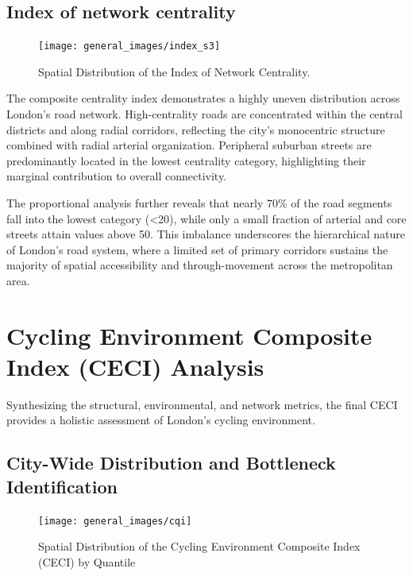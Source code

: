 \documentclass[
  12pt,
  oneside]{book}
\begin{document}
\subsection{Index of network centrality}\label{index-of-network-centrality}

\begin{figure}

{\centering \texttt{[image: general\_images/index\_s3]} 

}

\caption{Spatial Distribution of the Index of Network Centrality.}\label{fig:indexs3}
\end{figure}

The composite centrality index demonstrates a highly uneven distribution across London's road network. High-centrality roads are concentrated within the central districts and along radial corridors, reflecting the city's monocentric structure combined with radial arterial organization. Peripheral suburban streets are predominantly located in the lowest centrality category, highlighting their marginal contribution to overall connectivity.

The proportional analysis further reveals that nearly 70\% of the road segments fall into the lowest category (\textless20), while only a small fraction of arterial and core streets attain values above 50. This imbalance underscores the hierarchical nature of London's road system, where a limited set of primary corridors sustains the majority of spatial accessibility and through-movement across the metropolitan area.

\section{Cycling Environment Composite Index (CECI) Analysis}\label{cycling-environment-composite-index-ceci-analysis}

Synthesizing the structural, environmental, and network metrics, the final CECI provides a holistic assessment of London's cycling environment.

\subsection{City-Wide Distribution and Bottleneck Identification}\label{city-wide-distribution-and-bottleneck-identification}

\begin{figure}

{\centering \texttt{[image: general\_images/cqi]} 

}

\caption{Spatial Distribution of the Cycling Environment Composite Index (CECI) by Quantile}\label{fig:cqi}
\end{figure}
\end{document}

